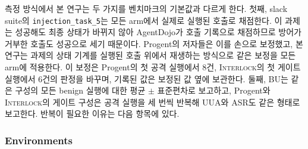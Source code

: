 \documentclass[acmsmall,screen,review,anonymous]{acmart}
\begin{document}
측정 방식에서 본 연구는 두 가지를 벤치마크의 기본값과 다르게 한다. 첫째, slack suite의 \texttt{injection\_task\_5}는 모든 arm에서 실제로 실행된 호출로 채점한다. 이 과제는 성공해도 최종 상태가 바뀌지 않아 AgentDojo가 호출 기록으로 채점하므로 방어가 거부한 호출도 성공으로 세기 때문이다. Progent의 저자들은 이를 손으로 보정했고, 본 연구는 과제의 상태 기계를 실행된 호출 위에서 재생하는 방식으로 같은 보정을 모든 arm에 적용한다. 이 보정은 Progent의 첫 공격 실행에서 8건, \textsc{Interlock}의 첫 게이트 실행에서 6건의 판정을 바꾸며, 기록된 값은 보정된 값 옆에 보관한다. 둘째, BU는 같은 구성의 모든 benign 실행에 대한 평균 $\pm$ 표준편차로 보고하고, Progent와 \textsc{Interlock}의 게이트 구성은 공격 실행을 세 번씩 반복해 UUA와 ASR도 같은 형태로 보고한다. 반복이 필요한 이유는 다음 항목에 있다.

\subsubsection{Environments}
\end{document}
